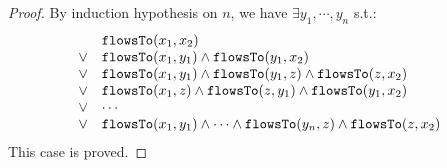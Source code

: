 \begin{proof}
By induction hypothesis on $n$, we have $\exists y_1, \cdots, y_n$ s.t.:
\[
\begin{array}{ll}
      & \mathtt{flowsTo}(x_1, x_2) \\
  \lor  & \mathtt{flowsTo}(x_1, y_1) \land \mathtt{flowsTo}(y_1, x_2)\\
  \lor  & \mathtt{flowsTo}(x_1, y_1) \land \mathtt{flowsTo}(y_1, z) \land \mathtt{flowsTo}(z, x_2) \\
  \lor  & \mathtt{flowsTo}(x_1, z) \land \mathtt{flowsTo}(z, y_1) \land \mathtt{flowsTo}(y_1, x_2) \\
  \lor  & \cdots \\
  \lor  & \mathtt{flowsTo}(x_1, y_1) \land \cdots \land \mathtt{flowsTo}(y_n, z) \land \mathtt{flowsTo}(z, x_2) \\
\end{array}
\]
This case is proved.


\end{proof}
